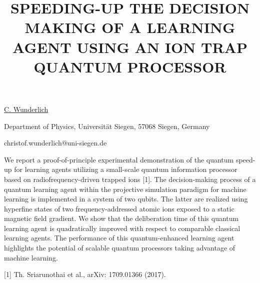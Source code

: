 \title{SPEEDING-UP THE DECISION MAKING OF A LEARNING AGENT USING AN ION TRAP QUANTUM PROCESSOR}

\underline{C. Wunderlich} 

{\normalsize{\vspace{-4mm}
Department of Physics, Universit\"{a}t Siegen, 57068 Siegen, Germany



\email christof.wunderlich@uni-siegen.de}}

We report a proof-of-principle experimental demonstration of the quantum speed-up for learning agents utilizing a small-scale quantum information processor based on radiofrequency-driven trapped ions [1]. The decision-making process of a quantum learning agent within the projective simulation paradigm for machine learning is implemented in a system of two qubits. The latter are realized using hyperfine states of two frequency-addressed atomic ions exposed to a static magnetic field gradient. We show that the deliberation time of this quantum learning agent is quadratically improved with respect to comparable classical learning agents. The performance of this quantum-enhanced learning agent highlights the potential of scalable quantum processors taking advantage of machine learning.

{\normalsize
[1] Th. Sriarunothai et al., arXiv: 1709.01366 (2017).
}

\vspace{\baselineskip} 